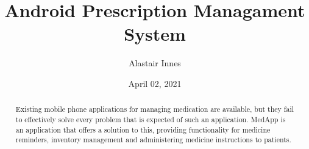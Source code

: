 \documentclass{l4proj}
\begin{document}
\title{Android Prescription Managament System}
\author{Alastair Innes}
\date{April 02, 2021}

\maketitle

\begin{abstract}
    Existing mobile phone applications for managing medication are available, but they fail to effectively solve every problem that is expected of such an application. MedApp is an application that offers a solution to this, providing functionality for medicine reminders, inventory management and administering medicine instructions to patients. 
\end{abstract}


%
%
%
\educationalconsent


\tableofcontents
\end{document}
